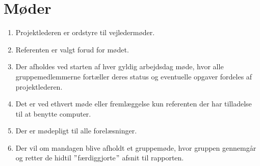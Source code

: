 \section{Møder}
\begin{enumerate}
\item{Projektlederen er ordstyre til vejledermøder.}
\item Referenten er valgt forud for mødet.
\item{Der afholdes ved starten af hver gyldig arbejdsdag møde, hvor alle gruppemedlemmerne
fortæller deres status og eventuelle opgaver fordeles af projektlederen.}
\item{Det er ved ethvert møde eller fremlæggelse kun referenten der har tilladelse til at benytte computer.}
\item{Der er mødepligt til alle forelæsninger.}
\item{Der vil om mandagen blive afholdt et gruppemøde, hvor gruppen gennemgår og retter de hidtil $"$færdiggjorte$"$ afsnit til rapporten.}
\end{enumerate}
